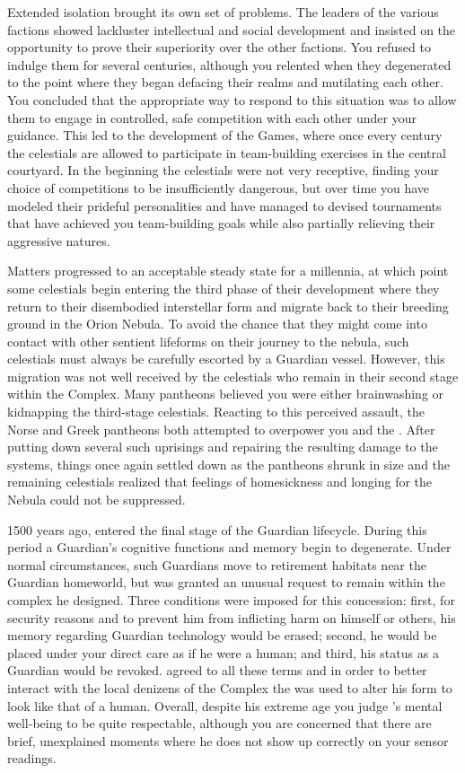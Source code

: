 \documentclass[char]{guardians}
\begin{document}
Extended isolation brought its own set of problems. The leaders of the various factions showed lackluster intellectual and social development and insisted on the opportunity to prove their superiority over the other factions. You refused to indulge them for several centuries, although you relented when they degenerated to the point where they began defacing their realms and mutilating each other. You concluded that the appropriate way to respond to this situation was to allow them to engage in controlled, safe competition with each other under your guidance. This led to the development of the Games, where once every century the celestials are allowed to participate in team-building exercises in the central courtyard. In the beginning the celestials were not very receptive, finding your choice of competitions to be insufficiently dangerous, but over time you have modeled their prideful personalities and have managed to devised tournaments that have achieved you team-building goals while also partially relieving their aggressive natures.

Matters progressed to an acceptable steady state for a millennia, at which point some celestials begin entering the third phase of their development where they return to their disembodied interstellar form and migrate back to their breeding ground in the Orion Nebula. To avoid the chance that they might come into contact with other sentient lifeforms on their journey to the nebula, such celestials must always be carefully escorted by a Guardian vessel. However, this migration was not well received by the celestials who remain in their second stage within the Complex. Many pantheons believed you were either brainwashing or kidnapping the third-stage celestials. Reacting to this perceived assault, the Norse and Greek pantheons both attempted to overpower you and the \cWarden{}. After putting down several such uprisings and repairing the resulting damage to the systems, things once again settled down as the pantheons shrunk in size and the remaining celestials realized that feelings of homesickness and longing for the Nebula could not be suppressed.

1500 years ago, \cJascha{} entered the final stage of the Guardian lifecycle. During this period a Guardian's cognitive functions and memory begin to degenerate. Under normal circumstances, such Guardians move to retirement habitats near the Guardian homeworld, but \cJascha{} was granted an unusual request to remain within the complex he designed. Three conditions were imposed for this concession: first, for security reasons and to prevent him from inflicting harm on himself or others, his memory regarding Guardian technology would be erased; second, he would be placed under your direct care as if he were a human; and third, his status as a Guardian would be revoked. \cJascha{} agreed to all these terms and in order to better interact with the local denizens of the Complex the \assembler{} was used to alter his form to look like that of a human. Overall, despite his extreme age you judge \cJascha{}'s mental well-being to be quite respectable, although you are concerned that there are brief, unexplained moments where he does not show up correctly on your sensor readings.
\end{document}
